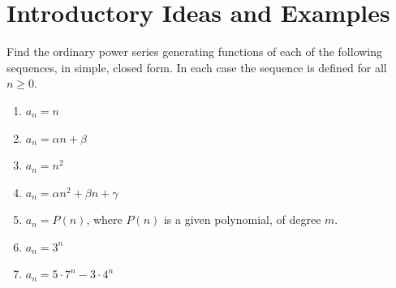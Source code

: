 \section{Introductory Ideas and Examples}
\begin{exercise} \label{ex:1-1}
    Find the ordinary power series generating functions of each of the following sequences, in simple, closed form. In each case the sequence is defined for all $n \geq 0$.
    \begin{enumerate}[label=(\alph*)]
        \item $a_n = n$
        \item $a_n = \alpha n + \beta$
        \item $a_n = n^2$
        \item $a_n = \alpha n^2 + \beta n + \gamma$
        \item $a_n = P(n)$, where $P(n)$ is a given polynomial, of degree $m$.
        \item $a_n = 3^n$
        \item $a_n= 5\cdot 7^n - 3\cdot 4^n$
    \end{enumerate}
\end{exercise}

